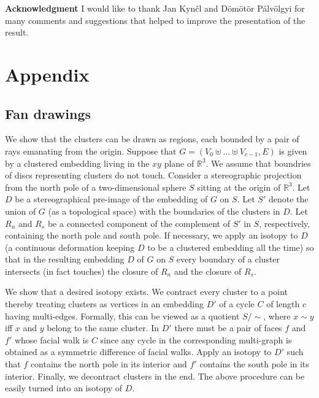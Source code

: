 \documentclass{llncs}
\begin{document}
	










{\bf Acknowledgment} I would like to thank Jan Kyn\v{c}l and D\"om\"ot\"or P\'alv\"olgyi for many comments and suggestions that helped to improve the presentation of the result.


	
	
	




 


 
 

 
   









\newpage


\section*{Appendix}


\subsection*{Fan drawings}
\label{sec:fan}
We show that the clusters can be drawn as regions, each bounded by a pair of rays emanating from the origin.
Suppose that $G=(V_0\uplus \ldots \uplus V_{c-1},E) $ is given by a clustered embedding
living in the $xy$ plane of $\mathbb{R}^3$.
We assume that boundries of discs representing clusters do not touch.
Consider a stereographic projection from the north pole of a two-dimensional sphere $S$ 
sitting at the origin of $\mathbb{R}^3$.
Let $D$ be a stereographical pre-image of the embedding of $G$ on $S$.
Let $S'$ denote the union of $G$ (as a topological space) with the boundaries of the clusters in $D$.
Let $R_n$ and $R_s$ be a connected component of the complement of $S'$ in $S$, respectively, containing the north pole and south pole.
If necessary, we apply an isotopy  to $D$ (a continuous deformation keeping $D$ to be a clustered embedding all the time)  so that in the resulting embedding $D$ of $G$ on $S$ every boundary of a cluster intersects (in fact touches) the closure of $R_n$ and  the closure of $R_s$. 

We show that a desired isotopy exists. We contract every cluster to a point thereby
treating clusters as vertices in an embedding $D'$ of a cycle $C$ of length $c$ having multi-edges. 
Formally, this can be viewed as a quotient $S/\sim$, where $x\sim y$ iff
$x$ and $y$ belong to the same cluster.
In $D'$ there must be a pair of faces $f$ and $f'$ whose facial walk is $C$ since any cycle in the corresponding multi-graph is obtained as a symmetric difference of facial walks. Apply an isotopy to $D'$ such that $f$ contains
the north pole in its interior and $f'$ contains the south pole in its interior. Finally, we decontract clusters in the end. The above procedure can be easily turned into an isotopy of $D$. 
\end{document}
